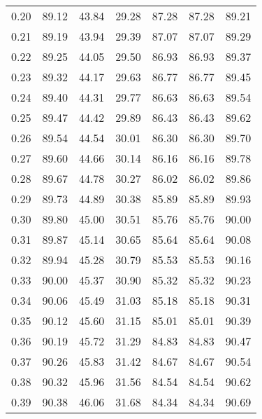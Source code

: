 \begin{tabular}{|c|c|c|c|c|c|c|}
      0.20 &     89.12 &     43.84 &      29.28 &   87.28 &      87.28 &         89.21 \\
      0.21 &     89.19 &     43.94 &      29.39 &   87.07 &      87.07 &         89.29 \\
      0.22 &     89.25 &     44.05 &      29.50 &   86.93 &      86.93 &         89.37 \\
      0.23 &     89.32 &     44.17 &      29.63 &   86.77 &      86.77 &         89.45 \\
      0.24 &     89.40 &     44.31 &      29.77 &   86.63 &      86.63 &         89.54 \\
      0.25 &     89.47 &     44.42 &      29.89 &   86.43 &      86.43 &         89.62 \\
      0.26 &     89.54 &     44.54 &      30.01 &   86.30 &      86.30 &         89.70 \\
      0.27 &     89.60 &     44.66 &      30.14 &   86.16 &      86.16 &         89.78 \\
      0.28 &     89.67 &     44.78 &      30.27 &   86.02 &      86.02 &         89.86 \\
      0.29 &     89.73 &     44.89 &      30.38 &   85.89 &      85.89 &         89.93 \\
      0.30 &     89.80 &     45.00 &      30.51 &   85.76 &      85.76 &         90.00 \\
      0.31 &     89.87 &     45.14 &      30.65 &   85.64 &      85.64 &         90.08 \\
      0.32 &     89.94 &     45.28 &      30.79 &   85.53 &      85.53 &         90.16 \\
      0.33 &     90.00 &     45.37 &      30.90 &   85.32 &      85.32 &         90.23 \\
      0.34 &     90.06 &     45.49 &      31.03 &   85.18 &      85.18 &         90.31 \\
      0.35 &     90.12 &     45.60 &      31.15 &   85.01 &      85.01 &         90.39 \\
      0.36 &     90.19 &     45.72 &      31.29 &   84.83 &      84.83 &         90.47 \\
      0.37 &     90.26 &     45.83 &      31.42 &   84.67 &      84.67 &         90.54 \\
      0.38 &     90.32 &     45.96 &      31.56 &   84.54 &      84.54 &         90.62 \\
      0.39 &     90.38 &     46.06 &      31.68 &   84.34 &      84.34 &         90.69 \\

\end{tabular}

